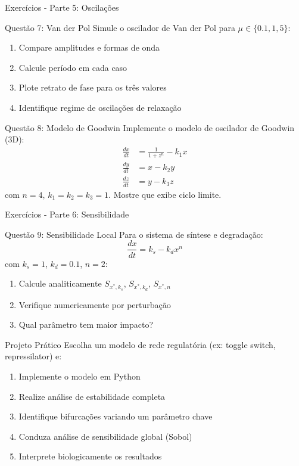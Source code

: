 \begin{frame}[allowframebreaks]{Exercícios - Parte 5: Oscilações}
\begin{block}{Questão 7: Van der Pol}
Simule o oscilador de Van der Pol para $\mu \in \{0.1, 1, 5\}$:
\begin{enumerate}
    \item Compare amplitudes e formas de onda
    \item Calcule período em cada caso
    \item Plote retrato de fase para os três valores
    \item Identifique regime de oscilações de relaxação
\end{enumerate}
\end{block}

\begin{block}{Questão 8: Modelo de Goodwin}
Implemente o modelo de oscilador de Goodwin (3D):
\begin{align*}
\frac{dx}{dt} &= \frac{1}{1 + z^n} - k_1 x\\
\frac{dy}{dt} &= x - k_2 y\\
\frac{dz}{dt} &= y - k_3 z
\end{align*}
com $n=4$, $k_1=k_2=k_3=1$. Mostre que exibe ciclo limite.
\end{block}
\end{frame}

\begin{frame}[allowframebreaks]{Exercícios - Parte 6: Sensibilidade}
\begin{block}{Questão 9: Sensibilidade Local}
Para o sistema de síntese e degradação:
\begin{equation*}
\frac{dx}{dt} = k_s - k_d x^n
\end{equation*}
com $k_s = 1$, $k_d = 0.1$, $n = 2$:
\begin{enumerate}
    \item Calcule analiticamente $S_{x^*, k_s}$, $S_{x^*, k_d}$, $S_{x^*, n}$
    \item Verifique numericamente por perturbação
    \item Qual parâmetro tem maior impacto?
\end{enumerate}
\end{block}

\begin{alertblock}{Projeto Prático}
Escolha um modelo de rede regulatória (ex: toggle switch, repressilator) e:
\begin{enumerate}
    \item Implemente o modelo em Python
    \item Realize análise de estabilidade completa
    \item Identifique bifurcações variando um parâmetro chave
    \item Conduza análise de sensibilidade global (Sobol)
    \item Interprete biologicamente os resultados
\end{enumerate}
\end{alertblock}
\end{frame}



